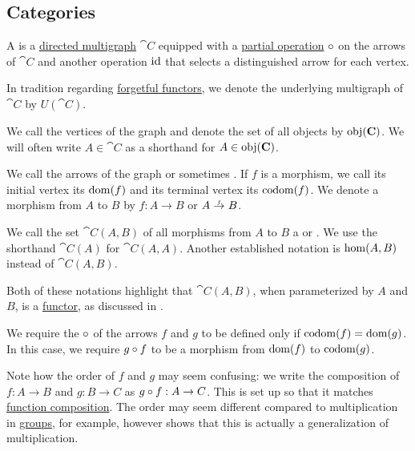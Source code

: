 \subsection{Categories}\label{subsec:categories}

\begin{definition}\label{def:category}\mimprovised
  A  is a \hyperref[def:directed_multigraph]{directed multigraph} \( \cat{C} \) equipped with a \hyperref[def:set_valued_map/partial]{partial operation} \( \bincirc \) on the arrows of \( \cat{C} \) and another operation \( \operatorname{id} \) that selects a distinguished arrow for each vertex.

  In tradition regarding \hyperref[def:concrete_category]{forgetful functors}, we denote the underlying multigraph of \( \cat{C} \) by \( U(\cat{C}) \).

  \begin{thmenum}[series=def:category]
     We call the vertices of the graph  and denote the set of all objects by \( \obj(\cat{C}) \). We will often write \( A \in \cat{C} \) as a shorthand for \( A \in \obj(\cat{C}) \).

     We call the arrows of the graph  or sometimes . If \( f \) is a morphism, we call its initial vertex its  \( \operatorname{dom}(f) \) and its terminal vertex its  \( \operatorname*{co\negthinspace\operatorname{dom}}(f) \). We denote a morphism from \( A \) to \( B \) by \( f: A \to B \) or \( A \reloset f \to B \).

    We call the set \( \cat{C}(A, B) \) of all morphisms from \( A \) to \( B \) a  or . We use the shorthand \( \cat{C}(A) \) for \( \cat{C}(A, A) \). Another established notation is \( \op{hom}(A, B) \) instead of \( \cat{C}(A, B) \).

    Both of these notations highlight that \( \cat{C}(A, B) \), when parameterized by \( A \) and \( B \), is a \hyperref[def:functor]{functor}, as discussed in .

     We require the  \( \bincirc \) of the arrows \( f \) and \( g \) to be defined only if \( \operatorname*{co\negthinspace\operatorname{dom}}(f) = \operatorname{dom}(g) \). In this case, we require \( g \bincirc f \) to be a morphism from \( \operatorname{dom}(f) \) to \( \operatorname*{co\negthinspace\operatorname{dom}}(g) \).

    Note how the order of \( f \) and \( g \) may seem confusing: we write the composition of \( f: A \to B \) and \( g: B \to C \) as \( g \bincirc f: A \to C \). This is set up so that it matches \hyperref[def:set_valued_map/composition]{function composition}. The order may seem different compared to multiplication in \hyperref[def:group]{groups}, for example, however  shows that this is actually a generalization of multiplication.


\end{thmenum}
\end{definition}
